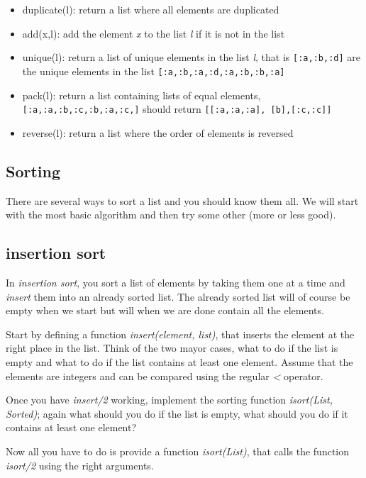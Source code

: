 \documentclass[a4paper,11pt]{article}
\begin{document}
\begin{itemize}
\item duplicate(l): return a list where all elements are duplicated
\item add(x,l): add the element {\em x} to the list {\em l} if it is not in the list
\item unique(l): return a list of unique elements in the list  {\em l}, that is {\tt [:a,:b,:d]} are the unique elements in the list {\tt [:a,:b,:a,:d,:a,:b,:b,:a]}
\item pack(l): return a list containing lists of equal elements, {\tt
  [:a,:a,:b,:c,:b,:a,:c,]} should return {\tt [[:a,:a,:a], [b],[:c,:c]]}
\item reverse(l): return a list where the order of elements is reversed
\end{itemize}



\subsection{Sorting}

There are several ways to sort a list and you should know them all. We
will start with the most basic algorithm and then try some other (more or less good).

\subsection{insertion sort}

In {\em insertion sort}, you sort a list of elements by taking them
one at a time and {\em insert} them into an already sorted list. The
already sorted list will of course be empty when we start but will
when we are done contain all the elements.

Start by defining a function {\em insert(element, list)}, that inserts
the element at the right place in the list. Think of the two mayor
cases, what to do if the list is empty and what to do if the list
contains at least one element. Assume that the elements are integers
and can be compared using the regular {\em <} operator.


Once you have {\em insert/2} working, implement the sorting function
{\em isort(List, Sorted)}; again what should you do if the list is
empty, what should you do if it contains at least one element?

Now all you have to do is provide a function {\em isort(List)}, that
calls the function {\em isort/2} using the right arguments.
\end{document}
